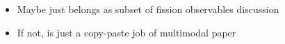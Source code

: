 \documentclass[../thesis.tex]{subfiles}
\begin{document}
\vspace{-1\baselineskip}

\begin{itemize}
	\item Maybe just belongs as subset of fission observables discussion
	\item If not, is just a copy-paste job of multimodal paper
\end{itemize}
\end{document}
